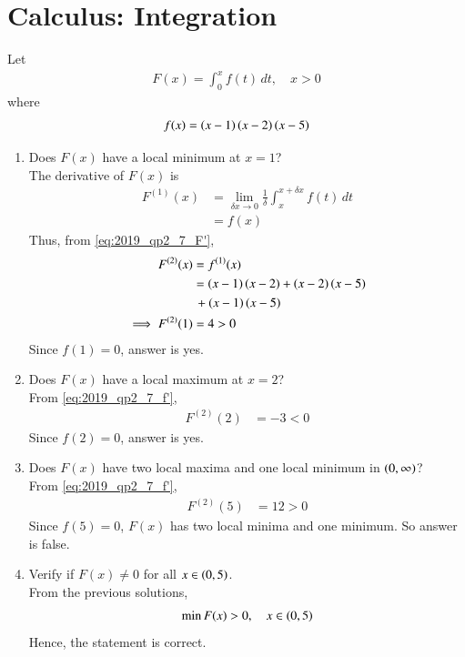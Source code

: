 \documentclass[journal,12pt,twocolumn]{IEEEtran}
\renewcommand\thesection{\arabic{section}}
\begin{document}
\section{Calculus: Integration}
Let
\begin{align}
F(x) = \int_{0}^{x}f(t)\,dt, \quad x > 0
\end{align}
where 
\begin{align}
f(x) = \left(x-1\right)\left(x-2\right)\left(x-5\right)
\end{align}
\begin{enumerate}[label=\thesection.\arabic*
,ref=\thesection.\theenumi]
\item Does $F(x)$ have a local minimum at $x=1$?
\\
\solution The derivative of $F(x)$ is 
\begin{align}
\label{eq:2019_qp2_7_F'}
F^{(1)}(x) &= \lim_{\delta x \to 0}\frac{1}{\delta}\int_{x}^{x+\delta x}f(t)\,dt\nonumber \\
&= f(x)
\end{align}
%
Thus, from \eqref{eq:2019_qp2_7_F'},
\begin{align}
\label{eq:2019_qp2_7_f'}
F^{(2)}(x) &=  f^{(1)}(x)
\nonumber \\
&= \left(x-1\right)\left(x-2\right)+\left(x-2\right)\left(x-5\right)
\nonumber \\
&\,+\left(x-1\right)\left(x-5\right)
\nonumber \\
\implies F^{(2)}(1) &= 4 > 0
\end{align}
%
Since $f(1) = 0$, answer is yes.
\item Does $F(x)$ have a local maximum at $x=2$?
\\
\solution From \eqref{eq:2019_qp2_7_f'},
\begin{align}
 F^{(2)}(2) &= -3 < 0
\end{align}
Since $f(2) = 0$, answer is yes.
\item Does $F(x)$ have two local maxima and one local minimum in $\left(0,\infty\right)$?
\\
\solution From \eqref{eq:2019_qp2_7_f'},
\begin{align}
F^{(2)}(5) &=12 > 0
\end{align}
Since $f(5)=0$, $F(x)$ has two local minima and one minimum. So answer is false.
\item Verify if $F(x)\ne 0$ for all $x \in \left(0,5\right)$.
\\
\solution From the previous solutions, 
\begin{align}
\min F(x) > 0, \quad x \in \left(0,5\right)
\end{align}
%
Hence, the statement is correct. 
\end{enumerate}
\end{document}
